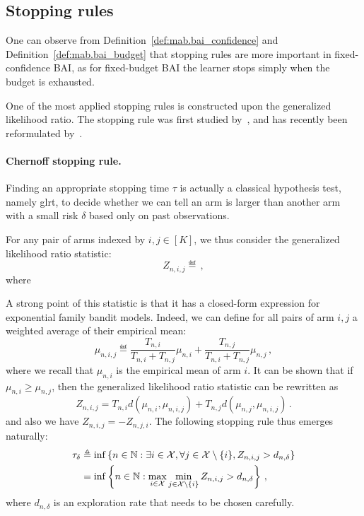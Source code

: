 \subsection{Stopping rules}\label{sec:mab.bai.stopping}

One can observe from Definition~\ref{def:mab.bai_confidence} and Definition~\ref{def:mab.bai_budget} that stopping rules are more important in fixed-confidence BAI, as for fixed-budget BAI the learner stops simply when the budget is exhausted.

One of the most applied stopping rules is constructed upon the \gls{generalized likelihood ratio}. The stopping rule was first studied by~\cite{chernoff1959}, and has recently been reformulated by~\cite{garivier2016tracknstop}.

\paragraph{Chernoff stopping rule.}
Finding an appropriate stopping time $\tau$ is actually a classical hypothesis test, namely \gls{glrt}, to decide whether we can tell an arm is larger than another arm with a small risk $\delta$ based only on past observations.

For any pair of arms indexed by $i, j \in [K]$, we thus consider the generalized likelihood ratio statistic:
\[
    Z_{n,i,j} \eqdef\,,
\]
where

A strong point of this statistic is that it has a closed-form expression for exponential family bandit models. Indeed, we can define for all pairs of arm $i, j$ a weighted average of their empirical mean:
\[
    \mu_{n,i,j} \eqdef \frac{T_{n,i}}{T_{n,i}+T_{n,j}}\mu_{n,i} + \frac{T_{n,j}}{T_{n,i}+T_{n,j}}\mu_{n,j}\,,
\]
where we recall that $\mu_{n,i}$ is the empirical mean of arm $i$. It can be shown that if $\mu_{n,i} \geq \mu_{n,j}$, then the generalized likelihood ratio statistic can be rewritten as
\[
    Z_{n,i,j} = T_{n,i}d(\mu_{n,i}, \mu_{n,i,j}) + T_{n,j}d(\mu_{n,j}, \mu_{n,i,j})\,.
\]
and also we have $Z_{n,i,j} = -Z_{n,j,i}$. The following stopping rule thus emerges naturally:
\begin{align}\label{eq:mab.glr}
    \tau_\delta &\triangleq \inf \left\lbrace n \in {\mathbb N} : \exists i \in \mathcal{X}, \forall j \in \mathcal{X} \setminus \{i\}, Z_{n,i,j} > d_{n,\delta} \right\rbrace\nonumber \\
    &= \inf \left\lbrace n \in {\mathbb N} : \max_{i \in \mathcal{X}} \min_{j \in \mathcal{X} \setminus \{i\}} Z_{n,i,j} > d_{n,\delta} \right\rbrace\,,
\end{align}
where $d_{n,\delta}$ is an exploration rate that needs to be chosen carefully.

